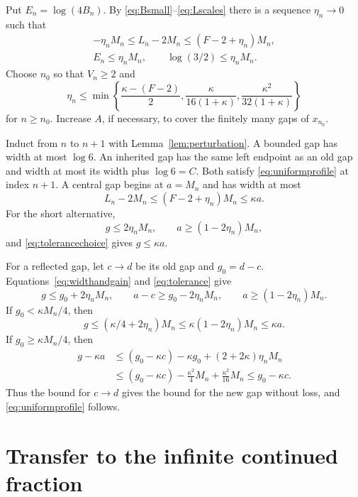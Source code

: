 \documentclass{amsart}
\numberwithin{equation}{section}
\begin{document}
Put $E_n=\log(4B_n)$. By \eqref{eq:Bsmall}--\eqref{eq:Lscales}
there is a sequence $\eta_n\to0$ such that
\begin{equation}\label{eq:tolerance}
\begin{gathered}
-\eta_nM_n\le L_n-2M_n\le(F-2+\eta_n)M_n,\\
E_n\le\eta_nM_n,\qquad \log(3/2)\le\eta_nM_n.
\end{gathered}
\end{equation}
Choose $n_0$ so that $V_n\ge2$ and
\begin{equation}\label{eq:tolerancechoice}
\eta_n\le\min\left\{\frac{\kappa-(F-2)}2,
\frac{\kappa}{16(1+\kappa)},
\frac{\kappa^2}{32(1+\kappa)}\right\}
\end{equation}
for $n\ge n_0$. Increase $A$, if necessary, to cover the finitely
many gaps of $x_{n_0}$.

Induct from $n$ to $n+1$ with Lemma~\ref{lem:perturbation}.
A bounded gap has width at most $\log6$. An inherited gap has the
same left endpoint as an old gap and width at most its width plus
$\log6=C$. Both satisfy \eqref{eq:uniformprofile} at index $n+1$.
A central gap begins at $a=M_n$ and has width at most
\[
L_n-2M_n\le(F-2+\eta_n)M_n\le\kappa a.
\]
For the short alternative,
\[
g\le2\eta_nM_n,\qquad a\ge(1-2\eta_n)M_n,
\]
and \eqref{eq:tolerancechoice} gives $g\le\kappa a$.

For a reflected gap, let $c\to d$ be its old gap and $g_0=d-c$.
Equations~\eqref{eq:widthandgain} and \eqref{eq:tolerance} give
\begin{equation}\label{eq:reflectioninduction}
g\le g_0+2\eta_nM_n,\qquad
a-c\ge g_0-2\eta_nM_n,\qquad
a\ge(1-2\eta_n)M_n.
\end{equation}
If $g_0<\kappa M_n/4$, then
\[
g\le(\kappa/4+2\eta_n)M_n
\le\kappa(1-2\eta_n)M_n\le\kappa a.
\]
If $g_0\ge\kappa M_n/4$, then
\begin{align*}
g-\kappa a
&\le(g_0-\kappa c)-\kappa g_0+(2+2\kappa)\eta_nM_n\\
&\le(g_0-\kappa c)-\frac{\kappa^2}{4}M_n
+\frac{\kappa^2}{16}M_n
\le g_0-\kappa c.
\end{align*}
Thus the bound for $c\to d$ gives the bound for the new gap without
loss, and \eqref{eq:uniformprofile} follows.

\section{Transfer to the infinite continued fraction}\label{sec:transfer}
\end{document}

